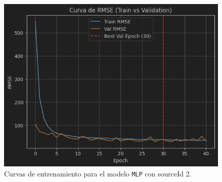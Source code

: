 \begin{figure}[H]
\begin{minipage}{0.48\textwidth}
		\vspace{0.2cm}
		\includegraphics[width=\linewidth]{includes/cap5/graphs/sid2_mlp_rmse.png}
	\end{minipage}
	\caption{Curvas de entrenamiento para el modelo \texttt{MLP} con sourceId 2.}
	\label{fig:curvas_sid2_mlp}
\end{figure}

